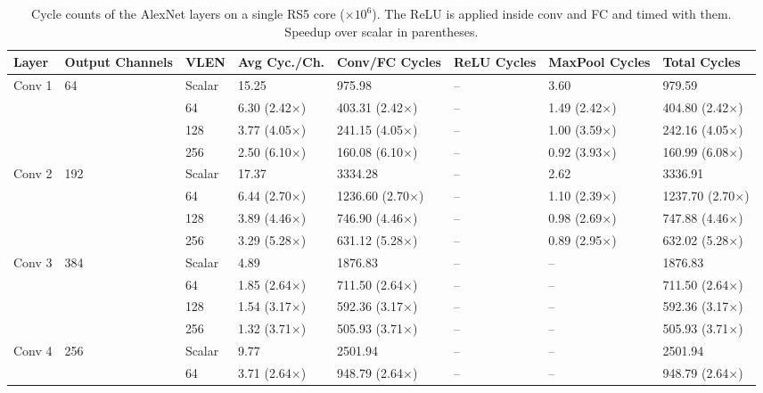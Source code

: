 \begin{table}[htbp]
\centering
\caption{Cycle counts of the AlexNet layers on a single RS5 core ($\times10^6$). The ReLU is applied inside conv and FC and timed with them. Speedup over scalar in parentheses.}
\label{tab:alexnet_single_core_breakdown}
\begin{tabular}{llllllll}
\toprule
\textbf{Layer} & \textbf{Output Channels} & \textbf{VLEN} & \textbf{Avg Cyc./Ch.} & \textbf{Conv/FC Cycles} & \textbf{ReLU Cycles} & \textbf{MaxPool Cycles} & \textbf{Total Cycles} \\
\midrule
\multirow{4}{*}{Conv 1} & \multirow{4}{*}{64} & Scalar & 15.25 & 975.98 & -- & 3.60 & 979.59 \\
 &  & 64 & 6.30 (2.42$\times$) & 403.31 (2.42$\times$) & -- & 1.49 (2.42$\times$) & 404.80 (2.42$\times$) \\
 &  & 128 & 3.77 (4.05$\times$) & 241.15 (4.05$\times$) & -- & 1.00 (3.59$\times$) & 242.16 (4.05$\times$) \\
 &  & 256 & 2.50 (6.10$\times$) & 160.08 (6.10$\times$) & -- & 0.92 (3.93$\times$) & 160.99 (6.08$\times$) \\
\midrule
\multirow{4}{*}{Conv 2} & \multirow{4}{*}{192} & Scalar & 17.37 & 3334.28 & -- & 2.62 & 3336.91 \\
 &  & 64 & 6.44 (2.70$\times$) & 1236.60 (2.70$\times$) & -- & 1.10 (2.39$\times$) & 1237.70 (2.70$\times$) \\
 &  & 128 & 3.89 (4.46$\times$) & 746.90 (4.46$\times$) & -- & 0.98 (2.69$\times$) & 747.88 (4.46$\times$) \\
 &  & 256 & 3.29 (5.28$\times$) & 631.12 (5.28$\times$) & -- & 0.89 (2.95$\times$) & 632.02 (5.28$\times$) \\
\midrule
\multirow{4}{*}{Conv 3} & \multirow{4}{*}{384} & Scalar & 4.89 & 1876.83 & -- & -- & 1876.83 \\
 &  & 64 & 1.85 (2.64$\times$) & 711.50 (2.64$\times$) & -- & -- & 711.50 (2.64$\times$) \\
 &  & 128 & 1.54 (3.17$\times$) & 592.36 (3.17$\times$) & -- & -- & 592.36 (3.17$\times$) \\
 &  & 256 & 1.32 (3.71$\times$) & 505.93 (3.71$\times$) & -- & -- & 505.93 (3.71$\times$) \\
\midrule
\multirow{4}{*}{Conv 4} & \multirow{4}{*}{256} & Scalar & 9.77 & 2501.94 & -- & -- & 2501.94 \\
 &  & 64 & 3.71 (2.64$\times$) & 948.79 (2.64$\times$) & -- & -- & 948.79 (2.64$\times$) \\

\end{tabular}
\end{table}
